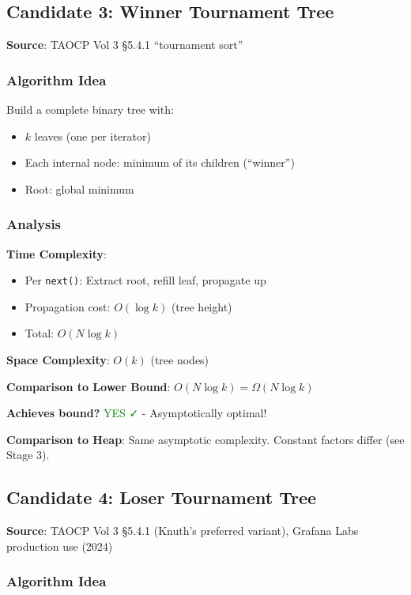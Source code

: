 \documentclass[11pt]{article}
\begin{document}
\subsection{Candidate 3: Winner Tournament Tree}

\textbf{Source}: TAOCP Vol 3 §5.4.1 ``tournament sort''

\subsubsection{Algorithm Idea}

Build a complete binary tree with:
\begin{itemize}
    \item $k$ leaves (one per iterator)
    \item Each internal node: minimum of its children (``winner'')
    \item Root: global minimum
\end{itemize}

\subsubsection{Analysis}

\textbf{Time Complexity}:
\begin{itemize}
    \item Per \texttt{next()}: Extract root, refill leaf, propagate up
    \item Propagation cost: $O(\log k)$ (tree height)
    \item Total: $O(N \log k)$
\end{itemize}

\textbf{Space Complexity}: $O(k)$ (tree nodes)

\textbf{Comparison to Lower Bound}: $O(N \log k) = \Omega(N \log k)$

\textbf{Achieves bound?} \textcolor{green}{YES ✓} - Asymptotically optimal!

\textbf{Comparison to Heap}: Same asymptotic complexity. Constant factors differ (see Stage 3).

\subsection{Candidate 4: Loser Tournament Tree}

\textbf{Source}: TAOCP Vol 3 §5.4.1 (Knuth's preferred variant), Grafana Labs production use (2024)

\subsubsection{Algorithm Idea}
\end{document}
